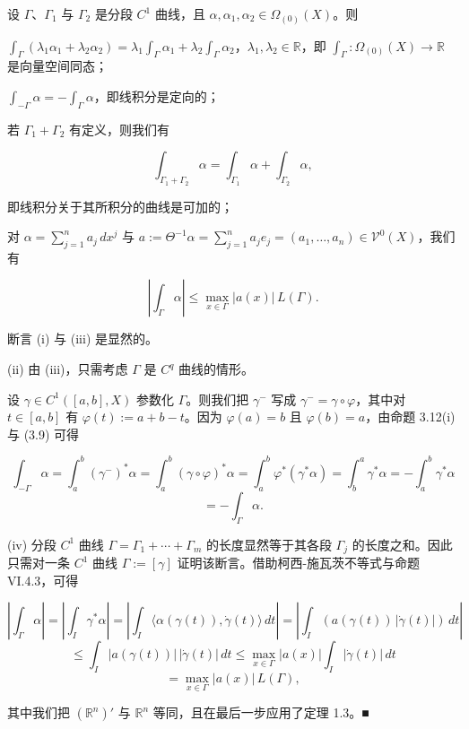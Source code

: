 \begin{proposition}

设 $ \Gamma $、$ \Gamma_1 $ 与 $ \Gamma_2 $ 是分段 $ C^1 $ 曲线，且 $ \alpha, \alpha_1, \alpha_2 \in \Omega_{(0)}(X) $。则

\begin{subitems}
\item

$ \int_{\Gamma}(\lambda_1\alpha_1+\lambda_2\alpha_2)=\lambda_1\int_{\Gamma}\alpha_1+\lambda_2\int_{\Gamma}\alpha_2 $，$ \lambda_1, \lambda_2 \in \mathbb{R} $，即 $ \int_{\Gamma} : \Omega_{(0)}(X)\to\mathbb{R} $ 是向量空间同态；

\item

$ \int_{-\Gamma}\alpha=-\int_{\Gamma}\alpha $，即线积分是定向的；

\item

若 $ \Gamma_1+\Gamma_2 $ 有定义，则我们有

\[
\int_{\Gamma_1+\Gamma_2}\alpha=\int_{\Gamma_1}\alpha+\int_{\Gamma_2}\alpha ,
\]

即线积分关于其所积分的曲线是可加的；

\item

对 $ \alpha=\sum_{j=1}^{n}a_j\,dx^{j} $ 与 $ a:=\Theta^{-1}\alpha=\sum_{j=1}^{n}a_j e_j=(a_1,\ldots,a_n)\in\mathcal{V}^{0}(X) $，我们有

\[
\left|\int_{\Gamma}\alpha\right|\le\max_{x\in\Gamma}|a(x)|\,L(\Gamma) .
\]

\proofhead
断言 (i) 与 (iii) 是显然的。
\end{subitems}

(ii) 由 (iii)，只需考虑 $ \Gamma $ 是 $ C^{q} $ 曲线的情形。

设 $ \gamma \in C^1([a, b], X) $ 参数化 $ \Gamma $。则我们把 $ \gamma^{-} $ 写成 $ \gamma^{-}=\gamma\circ\varphi $，其中对 $ t \in [a, b] $ 有 $ \varphi(t):=a+b-t $。因为 $ \varphi(a)=b $ 且 $ \varphi(b)=a $，由命题 3.12(i) 与 (3.9) 可得

\[
\int_{-\Gamma}\alpha=\int_a^b(\gamma^{-})^{*}\alpha=\int_a^b(\gamma\circ\varphi)^{*}\alpha=\int_a^b\varphi^{*}(\gamma^{*}\alpha)=\int_b^a\gamma^{*}\alpha=-\int_a^b\gamma^{*}\alpha
\]
\[
=-\int_{\Gamma}\alpha .
\]

(iv) 分段 $ C^1 $ 曲线 $ \Gamma=\Gamma_1+\cdots+\Gamma_m $ 的长度显然等于其各段 $ \Gamma_j $ 的长度之和。因此只需对一条 $ C^1 $ 曲线 $ \Gamma:=[\gamma] $ 证明该断言。借助柯西-施瓦茨不等式与命题 VI.4.3，可得

\[
\left|\int_{\Gamma}\alpha\right|=\left|\int_I\gamma^{*}\alpha\right|=\left|\int_I\langle\alpha(\gamma(t)),\dot{\gamma}(t)\rangle\,dt\right|=\left|\int_I(a(\gamma(t))\,|\dot{\gamma}(t)|)\,dt\right|
\]
\[
\le\int_I|a(\gamma(t))|\,|\dot{\gamma}(t)|\,dt\le\max_{x\in\Gamma}|a(x)|\int_I|\dot{\gamma}(t)|\,dt
\]
\[
=\max_{x\in\Gamma}|a(x)|\,L(\Gamma) ,
\]

其中我们把 $ (\mathbb{R}^{n})' $ 与 $ \mathbb{R}^{n} $ 等同，且在最后一步应用了定理 1.3。\nobreak\hspace{0.35em}■

\end{proposition}

